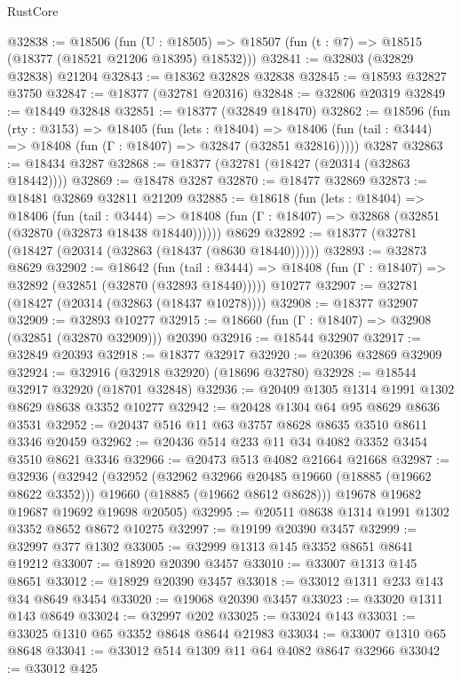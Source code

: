 \begin{lexlean}{RustCore}
\begin{coremodule}
@32838 := @18506
    (fun (U : @18505) => @18507 (fun (t : @7) => @18515 (@18377 (@18521 @21206 @18395) @18532)))
@32841 := @32803 (@32829 @32838) @21204
@32843 := @18362 @32828 @32838
@32845 := @18593 @32827 @3750
@32847 := @18377 (@32781 @20316)
@32848 := @32806 @20319
@32849 := @18449 @32848
@32851 := @18377 (@32849 @18470)
@32862 := @18596
    (fun (rty : @3153) =>
    @18405
      (fun (lets : @18404) =>
      @18406 (fun (tail : @3444) => @18408 (fun (Γ : @18407) => @32847 (@32851 @32816)))))
    @3287
@32863 := @18434 @3287
@32868 := @18377 (@32781 (@18427 (@20314 (@32863 @18442))))
@32869 := @18478 @3287
@32870 := @18477 @32869
@32873 := @18481 @32869 @32811 @21209
@32885 := @18618
    (fun (lets : @18404) =>
    @18406
      (fun (tail : @3444) =>
      @18408 (fun (Γ : @18407) => @32868 (@32851 (@32870 (@32873 @18438 @18440))))))
    @8629
@32892 := @18377 (@32781 (@18427 (@20314 (@32863 (@18437 (@8630 @18440))))))
@32893 := @32873 @8629
@32902 := @18642
    (fun (tail : @3444) => @18408 (fun (Γ : @18407) => @32892 (@32851 (@32870 (@32893 @18440)))))
    @10277
@32907 := @32781 (@18427 (@20314 (@32863 (@18437 @10278))))
@32908 := @18377 @32907
@32909 := @32893 @10277
@32915 := @18660 (fun (Γ : @18407) => @32908 (@32851 (@32870 @32909))) @20390
@32916 := @18544 @32907
@32917 := @32849 @20393
@32918 := @18377 @32917
@32920 := @20396 @32869 @32909
@32924 := @32916 (@32918 @32920) (@18696 @32780)
@32928 := @18544 @32917 @32920 (@18701 @32848)
@32936 := @20409 @1305 @1314 @1991 @1302 @8629 @8638 @3352 @10277
@32942 := @20428 @1304 @64 @95 @8629 @8636 @3531
@32952 := @20437 @516 @11 @63 @3757 @8628 @8635 @3510 @8611 @3346 @20459
@32962 := @20436 @514 @233 @11 @34 @4082 @3352 @3454 @3510 @8621 @3346
@32966 := @20473 @513 @4082 @21664 @21668
@32987 := @32936
    (@32942
      (@32952
        (@32962 @32966 @20485 @19660 (@18885 (@19662 @8622 @3352)))
        @19660
        (@18885 (@19662 @8612 @8628)))
      @19678
      @19682
      @19687
      @19692
      @19698
      @20505)
@32995 := @20511 @8638 @1314 @1991 @1302 @3352 @8652 @8672 @10275
@32997 := @19199 @20390 @3457
@32999 := @32997 @377 @1302
@33005 := @32999 @1313 @145 @3352 @8651 @8641 @19212
@33007 := @18920 @20390 @3457
@33010 := @33007 @1313 @145 @8651
@33012 := @18929 @20390 @3457
@33018 := @33012 @1311 @233 @143 @34 @8649 @3454
@33020 := @19068 @20390 @3457
@33023 := @33020 @1311 @143 @8649
@33024 := @32997 @202
@33025 := @33024 @143
@33031 := @33025 @1310 @65 @3352 @8648 @8644 @21983
@33034 := @33007 @1310 @65 @8648
@33041 := @33012 @514 @1309 @11 @64 @4082 @8647 @32966
@33042 := @33012 @425

\end{coremodule}
\end{lexlean}
